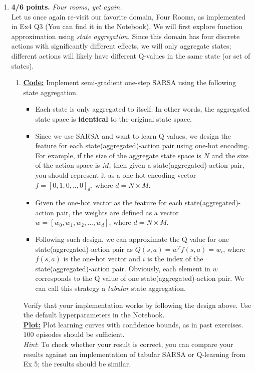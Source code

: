 \documentclass{article}
\begin{document}
\begin{enumerate}
\item \textbf{4/6 points.} \textit{Four rooms, yet again.}\\
Let us once again re-visit our favorite domain, Four Rooms, as implemented in Ex4 Q3 (You can find it in the Notebook). We will first explore function approximation using \textit{state aggregation}. Since this domain has four discrete actions with significantly different effects, we will only aggregate states; different actions will likely have different Q-values in the same state (or set of states).
\begin{enumerate}
\item \uline{\textbf{Code:}} Implement semi-gradient one-step SARSA using the following state aggregation. \\
\begin{itemize}
    \item Each state is only aggregated to itself. In other words, the aggregated state space is \textbf{identical} to the original state space.
    \item Since we use SARSA and want to learn Q values, we design the feature for each state(aggregated)-action pair using one-hot encoding. For example, if the size of the aggregate state space is $N$ and the size of the action space is $M$, then given a state(aggregated)-action pair, you should represent it as a one-hot encoding vector $f = [0, 1, 0, ..,0]_d$, where $d = N \times M$.
    \item Given the one-hot vector as the feature for each state(aggregated)-action pair, the weights are defined as a vector $w = [w_0, w_1, w_2, ..., w_d]$, where $d = N \times M$. 
    \item Following such design, we can approximate the Q value for one state(aggregated)-action pair as $Q(s, a) = w^{T}f(s, a) = w_i$, where $f(s, a)$ is the one-hot vector and $i$ is the index of the state(aggregated)-action pair. Obviously, each element in $w$ corresponds to the Q value of one state(aggregated)-action pair. We can call this strategy a \textit{tabular} state aggregation.  
\end{itemize}
Verify that your implementation works by following the design above. Use the default hyperparameters in the Notebook. \\ 
\uline{\textbf{Plot:}} Plot learning curves with confidence bounds, as in past exercises. $100$ episodes should be sufficient. \\
\textit{Hint}: To check whether your result is correct, you can compare your results against an implementation of tabular SARSA or Q-learning from Ex 5; the results should be similar.


\end{enumerate}
\end{enumerate}
\end{document}
